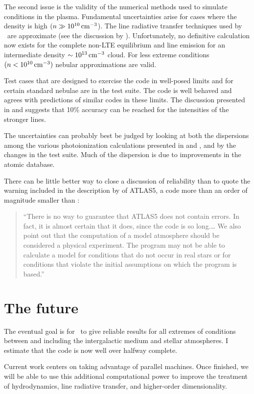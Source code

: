 The second issue is the validity of the numerical methods used to simulate
conditions in the plasma.
Fundamental uncertainties arise for cases where
the density is high $(n\gg 10^{10} {\rm\thinspace cm^{-3}}$).
The line radiative transfer techniques
used by \Cloudy\ are approximate (see the discussion by \citealp{Avrett1988}).
Unfortunately, no definitive calculation now exists for the complete
non-LTE equilibrium and line emission for an intermediate density
$\sim10^{13} {\rm\thinspace cm^{-3}}$ cloud.
For less extreme conditions $(n < 10^{10} {\rm\thinspace cm^{-3}})$ nebular
approximations are valid.

Test cases that are designed to exercise the code in well-posed limits
and for certain standard nebulae are in the test suite.
The code is well
behaved and agrees with predictions of similar codes in these limits.
The
discussion presented in \citet{Ferland1995} and \citet{Pequignot2001}
suggests that 10\% accuracy can be reached for the intensities of the
stronger lines.

The uncertainties can probably best be judged by looking at both the
dispersions among the various photoionization calculations presented in
\citet{Ferland1995} and \citet{Pequignot2001}, and by the changes
in the test suite.
Much of the dispersion is due to improvements in the
atomic database.

There can be little better way to close a discussion of reliability
than to quote the warning included in the description by
\cite[see page xiii]{Kurucz1970} of ATLAS5, a code more than an order of
magnitude smaller than \Cloudy:

\begin{quote}

\noindent ``There is no way to guarantee that ATLAS5 does not contain errors.
In fact, it is almost certain that it does, since the code is so long.\dots
We also point out that the computation of a model atmosphere
should be considered a physical experiment.  The program may not be able
to calculate a model for conditions that do not occur in real stars or for
conditions that violate the initial assumptions on which the program is
based.''
\end{quote}

\section{The future}

The eventual goal is for \Cloudy\ to give reliable results
for all extremes
of conditions between and including the intergalactic medium and stellar
atmospheres.
I estimate that the code is now well over halfway complete.

Current work centers on taking advantage of parallel machines. Once
finished, we will be able to use this additional computational power to
improve the treatment of hydrodynamics, line radiative transfer, and
higher-order dimensionality.
